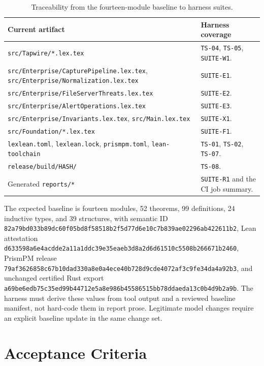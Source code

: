 \documentclass[11pt]{article}
\begin{document}
\begin{table}[htbp]
\centering
\small
\begin{tabularx}{\textwidth}{p{5.0cm} X}
\toprule
\textbf{Current artifact} & \textbf{Harness coverage} \\
\midrule
\texttt{src/Tapwire/*.lex.tex}
  & \texttt{TS-04}, \texttt{TS-05}, \texttt{SUITE-W1}. \\
\texttt{src/Enterprise/CapturePipeline.lex.tex},
\texttt{src/Enterprise/Normalization.lex.tex}
  & \texttt{SUITE-E1}. \\
\texttt{src/Enterprise/FileServerThreats.lex.tex}
  & \texttt{SUITE-E2}. \\
\texttt{src/Enterprise/AlertOperations.lex.tex}
  & \texttt{SUITE-E3}. \\
\texttt{src/Enterprise/Invariants.lex.tex}, \texttt{src/Main.lex.tex}
  & \texttt{SUITE-X1}. \\
\texttt{src/Foundation/*.lex.tex}
  & \texttt{SUITE-F1}. \\
\texttt{lexlean.toml}, \texttt{lexlean.lock}, \texttt{prismpm.toml}, \texttt{lean-toolchain}
  & \texttt{TS-01}, \texttt{TS-02}, \texttt{TS-07}. \\
\texttt{release/build/HASH/}
  & \texttt{TS-08}. \\
Generated \texttt{reports/*}
  & \texttt{SUITE-R1} and the CI job summary. \\
\bottomrule
\end{tabularx}
\caption{Traceability from the fourteen-module baseline to harness suites.}
\end{table}

The expected baseline is fourteen modules, 52 theorems, 99 definitions, 24 inductive types, and 39
structures, with semantic ID
\texttt{82a79bd033b89dc60f05bd8f58518b2f5d77d6e10c7b839ae02296ab422611b2}, Lean attestation
\texttt{d633598a6e4acdde2a11a1ddc39e35eaeb3d8a2d6d61510c5508b266671b2460}, PrismPM release
\texttt{79af3626858c67b10dad330a8e0a4ece40b728d9cde4072af3c9fe34da4a92b3}, and unchanged certified
Rust export \texttt{a69be6edb75c35ed99b44712e5a8e986b45586515bb78ddaeda13c0b4d9b2a9b}. The harness
must derive these values from tool output and a reviewed baseline manifest, not hard-code them in
report prose. Legitimate model changes require an explicit baseline update in the same change set.

\section{Acceptance Criteria}
\end{document}
